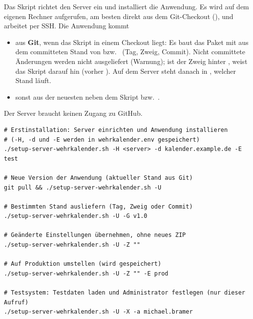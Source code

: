 Das Skript 
richtet den Server ein und installiert die Anwendung. Es wird auf dem
eigenen Rechner aufgerufen, am besten direkt aus dem Git-Checkout
(), und arbeitet per SSH. Die Anwendung kommt
\begin{itemize}
  \item aus \textbf{Git}, wenn das Skript in einem Checkout liegt: Es baut das
        Paket mit  aus dem committeten Stand von 
        bzw.\  (Tag, Zweig, Commit). Nicht committete
        Änderungen werden nicht ausgeliefert (Warnung); ist der Zweig hinter
        , weist das Skript darauf hin (vorher ).
        Auf dem Server steht danach in , welcher Stand
        läuft.
  \item sonst aus der neuesten  neben dem Skript
        bzw.\ .
\end{itemize}
Der Server braucht keinen Zugang zu GitHub.

\begin{lstlisting}
# Erstinstallation: Server einrichten und Anwendung installieren
# (-H, -d und -E werden in wehrkalender.env gespeichert)
./setup-server-wehrkalender.sh -H <server> -d kalender.example.de -E test

# Neue Version der Anwendung (aktueller Stand aus Git)
git pull && ./setup-server-wehrkalender.sh -U

# Bestimmten Stand ausliefern (Tag, Zweig oder Commit)
./setup-server-wehrkalender.sh -U -G v1.0

# Geänderte Einstellungen übernehmen, ohne neues ZIP
./setup-server-wehrkalender.sh -U -Z ""

# Auf Produktion umstellen (wird gespeichert)
./setup-server-wehrkalender.sh -U -Z "" -E prod

# Testsystem: Testdaten laden und Administrator festlegen (nur dieser Aufruf)
./setup-server-wehrkalender.sh -U -X -a michael.bramer
\end{lstlisting}

